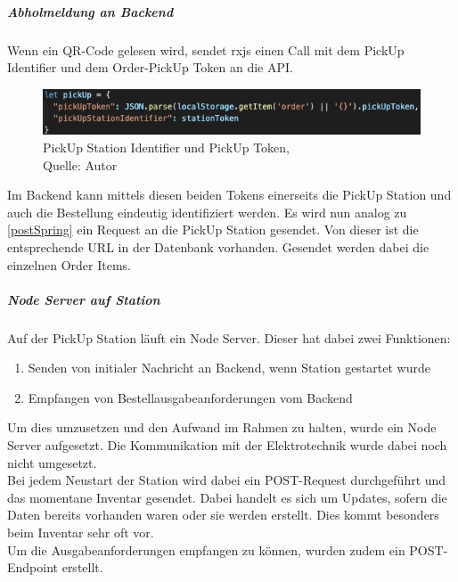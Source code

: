 \subparagraph{Abholmeldung an Backend}
Wenn ein QR-Code gelesen wird, sendet rxjs einen Call mit dem PickUp Identifier und dem Order-PickUp Token an die API. 
\begin{figure}[H]
	\centering
	\includegraphics[width=1\textwidth]{images/pickUpBody.PNG}
	\caption[PickUp Station Identifier und PickUp Token]{PickUp Station Identifier und PickUp Token,\\ Quelle: Autor}
	\label{img: pickUpBody}
\end{figure} 

Im Backend kann mittels diesen beiden Tokens einerseits die PickUp Station und auch die Bestellung eindeutig identifiziert werden. 
Es wird nun analog zu \ref{postSpring} ein Request an die PickUp Station gesendet. Von dieser ist die entsprechende URL in der Datenbank vorhanden. Gesendet werden dabei die einzelnen Order Items. 

\subparagraph{Node Server auf Station}
Auf der PickUp Station läuft ein Node Server. Dieser hat dabei zwei Funktionen: 
\begin{enumerate}
	\item Senden von initialer Nachricht an Backend, wenn Station gestartet wurde
	\item Empfangen von Bestellausgabeanforderungen vom Backend
\end{enumerate}
Um dies umzusetzen und den Aufwand im Rahmen zu halten, wurde ein Node Server aufgesetzt. Die Kommunikation mit der Elektrotechnik wurde dabei noch nicht umgesetzt. \\
Bei jedem Neustart der Station wird dabei ein POST-Request durchgeführt und das momentane Inventar gesendet. Dabei handelt es sich um Updates, sofern die Daten bereits vorhanden waren oder sie werden erstellt. Dies kommt besonders beim Inventar sehr oft vor. \\
Um die Ausgabeanforderungen empfangen zu können, wurden zudem ein POST-Endpoint erstellt. 

